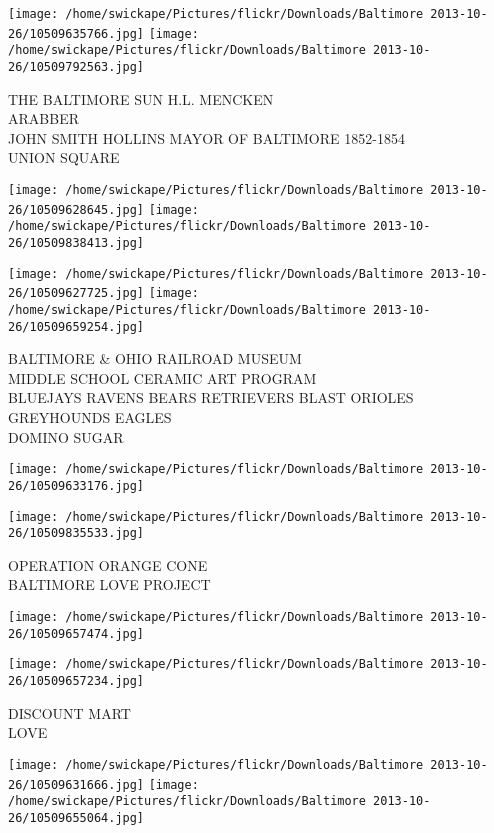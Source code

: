 \documentclass[10pt,letterpaper]{article}
\begin{document}
\texttt{[image: /home/swickape/Pictures/flickr/Downloads/Baltimore 2013-10-26/10509635766.jpg]}
\texttt{[image: /home/swickape/Pictures/flickr/Downloads/Baltimore 2013-10-26/10509792563.jpg]}

THE BALTIMORE SUN H.L. MENCKEN\\
ARABBER\\
JOHN SMITH HOLLINS MAYOR OF BALTIMORE 1852{-}1854\\
UNION SQUARE\\
\pagebreak

\texttt{[image: /home/swickape/Pictures/flickr/Downloads/Baltimore 2013-10-26/10509628645.jpg]}
\texttt{[image: /home/swickape/Pictures/flickr/Downloads/Baltimore 2013-10-26/10509838413.jpg]}

\texttt{[image: /home/swickape/Pictures/flickr/Downloads/Baltimore 2013-10-26/10509627725.jpg]}
\texttt{[image: /home/swickape/Pictures/flickr/Downloads/Baltimore 2013-10-26/10509659254.jpg]}

BALTIMORE \& OHIO RAILROAD MUSEUM\\
MIDDLE SCHOOL CERAMIC ART PROGRAM\\
BLUEJAYS RAVENS BEARS RETRIEVERS BLAST ORIOLES GREYHOUNDS EAGLES\\
DOMINO SUGAR\\
\pagebreak

\texttt{[image: /home/swickape/Pictures/flickr/Downloads/Baltimore 2013-10-26/10509633176.jpg]}

\vspace{0.25in}
\texttt{[image: /home/swickape/Pictures/flickr/Downloads/Baltimore 2013-10-26/10509835533.jpg]}

OPERATION ORANGE CONE\\
BALTIMORE LOVE PROJECT\\
\pagebreak

\texttt{[image: /home/swickape/Pictures/flickr/Downloads/Baltimore 2013-10-26/10509657474.jpg]}

\vspace{0.25in}
\texttt{[image: /home/swickape/Pictures/flickr/Downloads/Baltimore 2013-10-26/10509657234.jpg]}

DISCOUNT MART\\
LOVE\\
\pagebreak

\texttt{[image: /home/swickape/Pictures/flickr/Downloads/Baltimore 2013-10-26/10509631666.jpg]}
\texttt{[image: /home/swickape/Pictures/flickr/Downloads/Baltimore 2013-10-26/10509655064.jpg]}
\end{document}
